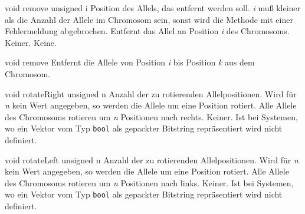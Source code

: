 \documentclass{report}
\begin{document}
\vspace{4ex}

    \printMethodWithOneParam
    {void} 
    {remove}
    {unsigned}
    {i} 
    {Position des Allels, das entfernt 
    werden soll. {\em i} mu{\ss} kleiner als die Anzahl der Allele im 
    Chromosom sein, sonst wird die Methode mit einer Fehlermeldung
    abgebrochen.}
    {Entfernt das Allel an Position {\em i} des Chromosoms.}
    {Keiner.}
    {Keine.}

\vspace{4ex}

    \setCorrectWidthThree{8pt}
    \printMethodWithParamsSaved
        {void}
        {}
        {remove}
        {Entfernt die Allele von Position {\em i} bis Position {\em k} aus dem Chromosom.}
        {}
    \setCorrectWidthThree{4pt}

\vspace{4ex}

    \printMethodWithOneParam
    {void} 
    {rotateRight}
    {unsigned} 
    {n} 
    {Anzahl der zu rotierenden 
    Allelpositionen. Wird f\"ur {\em n} kein Wert angegeben, so werden die
    Allele um eine Position rotiert.}
    {Alle Allele des Chromosoms rotieren um {\em n} Positionen nach rechts.}
    {Keiner.}
    {Ist bei Systemen, wo ein Vektor vom Typ {\tt bool} 
    als gepackter Bitstring repr\"asentiert wird nicht definiert.}

\vspace{4ex}

    \printMethodWithOneParam
    {void} 
    {rotateLeft}
    {unsigned} 
    {n} 
    {Anzahl der zu rotierenden 
    Allelpositionen. Wird f\"ur {\em n} kein Wert angegeben, so werden die
    Allele um eine Position rotiert.}
    {Alle Allele des Chromosoms rotieren um {\em n} Positionen nach links.}
    {Keiner.}
    {Ist bei Systemen, wo ein Vektor vom Typ {\tt bool} als
    gepackter Bitstring repr\"asentiert wird nicht definiert.}
\end{document}
